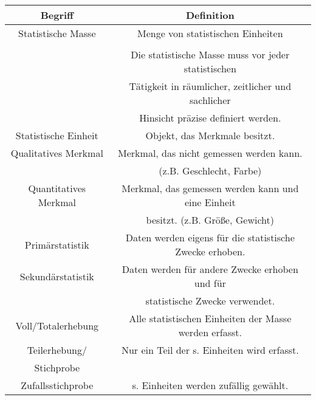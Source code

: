 \documentclass[12pt]{scrartcl}
\begin{document}
\begin{table}[h]
    \begin{tabular}{ | c | c | }
        \hline
        Begriff               & Definition                                                \\
        \hline
        \hline
        Statistische Masse    & Menge von statistischen Einheiten                         \\&\\
                              & Die statistische Masse muss vor jeder statistischen       \\
                              & Tätigkeit in räumlicher, zeitlicher und sachlicher        \\
                              & Hinsicht präzise definiert werden.                        \\
        \hline
        Statistische Einheit  & Objekt, das Merkmale besitzt.                             \\
        \hline
        Qualitatives Merkmal  & Merkmal, das nicht gemessen werden kann.                  \\
                              & (z.B. Geschlecht, Farbe)                                  \\
        \hline
        Quantitatives Merkmal & Merkmal, das gemessen werden kann und eine Einheit        \\
                              & besitzt. (z.B. Größe, Gewicht)                            \\
        \hline
        Primärstatistik       & Daten werden eigens für die statistische Zwecke erhoben.  \\
        \hline
        Sekundärstatistik     & Daten werden für andere Zwecke erhoben und für            \\
                              & statistische Zwecke verwendet.                            \\
        \hline
        Voll/Totalerhebung    & Alle statistischen Einheiten der Masse werden erfasst.    \\
        \hline
        Teilerhebung/         & Nur ein Teil der s. Einheiten wird erfasst.               \\
        Stichprobe            &                                                           \\
        \hline
        Zufallsstichprobe     & s. Einheiten werden zufällig gewählt.                     \\
        \hline

\end{tabular}
\end{table}
\end{document}
